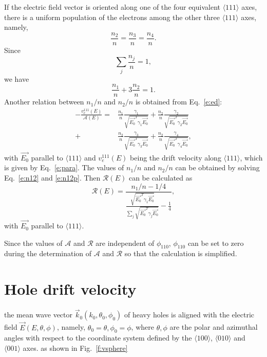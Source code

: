 \documentclass[epj]{svjour}
\begin{document}
If the electric field vector is oriented along one of the four
equivalent $\langle 111 \rangle$ axes, there is a uniform population
of the electrons among the other three $\langle 111 \rangle$ axes,
namely,
\begin{equation} 
\label{e:n111} 
\frac{n_{2}}{n} = \frac{n_{3}}{n} = \frac{n_{4}}{n}. 
\end{equation} 
Since 
\begin{equation} 
\label{e:nsum} 
\displaystyle \sum_{j}\frac{n_{j}}{n} = 1, 
\end{equation} 
we have 
\begin{equation} 
\label{e:n12} 
\frac{n_{1}}{n} + 3\frac{n_{2}}{n}= 1. 
\end{equation} 
Another relation between $n_{1}/n$ and $n_{2}/n$ is obtained from
Eq.~\ref{e:ed}:
\begin{equation} 
\label{e:n12p} 
\begin{split}
- \frac{v_{e}^{111}(E)}{\mathcal{A}(E)} = &
\frac{n_{1}}{n} \frac{\gamma_{1}} 
{\sqrt{\vec{E_{0}}^{T}\gamma_{1}\vec{E_{0}}}} +
\frac{n_{2}}{n} \frac{\gamma_{2}}         
{\sqrt{\vec{E_{0}}^{T}\gamma_{2}\vec{E_{0}}}} \\ + &
\frac{n_{2}}{n} \frac{\gamma_{3}}         
{\sqrt{\vec{E_{0}}^{T}\gamma_{3}\vec{E_{0}}}} +  
\frac{n_{2}}{n} \frac{\gamma_{4}}         
{\sqrt{\vec{E_{0}}^{T}\gamma_{4}\vec{E_{0}}}}, 
\end{split}
\end{equation}
with $\vec{E_{0}}$ parallel to $\langle 111 \rangle$ and
$v_{e}^{111}(E)$ being the drift velocity along $\langle 111 \rangle$,
which is given by Eq.~\ref{e:para}. The values of $n_{1}/n$ and
$n_{2}/n$ can be obtained by solving Eq.~\ref{e:n12} and
\ref{e:n12p}. Then $\mathcal{R}(E)$ can be calculated as
\begin{equation} 
\label{e:re} 
\mathcal{R}(E) = \frac{n_{1}/n - 1/4}
{\displaystyle \frac{\sqrt{\vec{E_{0}}^{T}\gamma_{1}\vec{E_{0}}}}
{\sum_{j}\sqrt{\vec{E_{0}}^{T}\gamma_{j}\vec{E_{0}}}} - 
\frac{1}{4}},
\end{equation} 
with $\vec{E_{0}}$ parallel to $\langle 111 \rangle$.

Since the values of $\mathcal{A}$ and $\mathcal{R}$ are independent of
$\phi_{110}$, $\phi_{110}$ can be set to zero during the determination
of $\mathcal{A}$ and $\mathcal{R}$ so that the calculation is
simplified.

\section{Hole drift velocity} 
\label{s:hole} 
the mean wave vector $\vec{k}_{0}(k_{0},
\theta_{0}, \phi_{0})$ of heavy holes is aligned with the electric
field $\vec{E}(E, \theta, \phi)$, namely, $\theta_{0} = \theta,
\phi_{0} = \phi$, where $\theta, \phi$ are the polar and azimuthal
angles with respect to the coordinate system defined by the $\langle
100 \rangle$, $\langle 010 \rangle$ and $\langle 001 \rangle$
axes. as shown in Fig.~\ref{f:vsphere}
  
\end{document}
